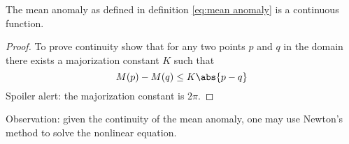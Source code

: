 \begin{theorem}
The mean anomaly as defined in definition \ref{eq:mean anomaly} is a continuous function.
\begin{proof}
To prove continuity show that for any two points $p$ and $q$ in the domain there exists a majorization constant $K$ such that
\begin{equation}
	M(p) - M(q) \le K \abs{p-q}
\label{eq:continuous}
\end{equation}
Spoiler alert: the majorization constant is $2\pi$.
\end{proof}
\end{theorem}
Observation: given the continuity of the mean anomaly, one may use Newton's method \cite[\S4.6]{gautschi2011numerical} to solve the nonlinear equation.


\endinput  %
